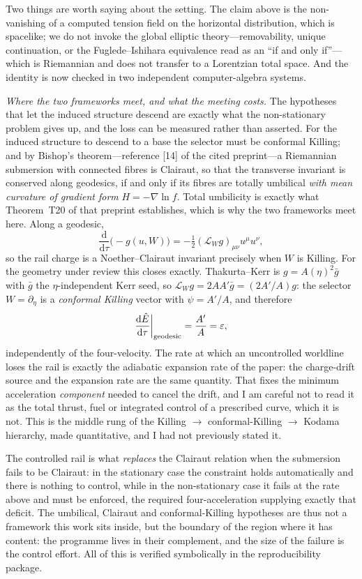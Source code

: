 \documentclass[11pt]{article}
\newcommand{\dd}{\mathrm{d}}
\begin{document}
Two things are worth saying about the setting. The claim above is the
non-vanishing of a computed tension field on the horizontal distribution, which is
spacelike; we do not invoke the global elliptic theory---removability, unique
continuation, or the Fuglede--Ishihara equivalence read as an ``if and only if''---%
which is Riemannian and does not transfer to a Lorentzian total space. And the
identity is now checked in two independent computer-algebra systems.

\emph{Where the two frameworks meet, and what the meeting costs.} The
hypotheses that let the induced structure descend are exactly what the
non-stationary problem gives up, and the loss can be measured rather than asserted. For the induced structure to descend to a base the selector must be
conformal Killing; and by Bishop's theorem---reference [14] of the cited
preprint---a Riemannian submersion with connected fibres is Clairaut, so that the
transverse invariant is conserved along geodesics, if and only if its fibres are
totally umbilical \emph{with mean curvature of gradient form} $H=-\nabla\ln f$. Total umbilicity is exactly what Theorem~T20 of that
preprint establishes, which is why the two frameworks meet here. Along a geodesic,
\[
   \frac{\dd}{\dd\tau}\big(\!-\!g(u,W)\big)
     =-\tfrac12(\mathcal L_Wg)_{\mu\nu}u^\mu u^\nu ,
\]
so the rail charge is a Noether--Clairaut invariant precisely when $W$ is Killing.
For the geometry under review this closes exactly. Thakurta--Kerr is
$g=A(\eta)^2\bar g$ with $\bar g$ the $\eta$-independent Kerr seed, so
$\mathcal L_Wg=2AA'\bar g=(2A'/A)g$: the selector $W=\partial_\eta$ is a
\emph{conformal Killing} vector with $\psi=A'/A$, and therefore
\[
   \frac{\dd\hat E}{\dd\tau}\bigg|_{\rm geodesic}=\frac{A'}{A}=\varepsilon ,
\]
independently of the four-velocity. The rate at which an uncontrolled worldline
loses the rail is exactly the adiabatic expansion rate of the paper: the
charge-drift source and the expansion rate are the same quantity. That fixes the
minimum acceleration \emph{component} needed to cancel the drift, and I am careful
not to read it as the total thrust, fuel or integrated control of a prescribed
curve, which it is not. This is the middle rung
of the Killing $\to$ conformal-Killing $\to$ Kodama hierarchy, made
quantitative, and I had not previously stated it.

The controlled rail is what \emph{replaces} the Clairaut relation when the
submersion fails to be Clairaut: in the stationary case the constraint holds
automatically and there is nothing to control, while in the non-stationary case it
fails at the rate above and must be enforced, the required four-acceleration
supplying exactly that deficit. The umbilical, Clairaut and conformal-Killing
hypotheses are thus not a framework this work sits inside, but the boundary of the
region where it has content: the programme lives in their complement, and the size
of the failure is the control effort. All of this is verified symbolically in the
reproducibility package.
\end{document}
